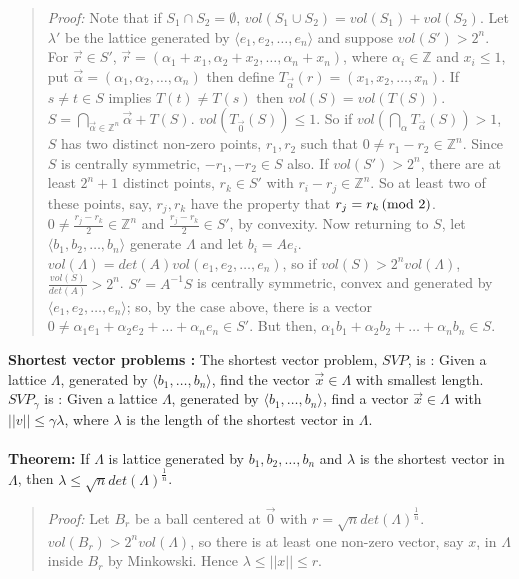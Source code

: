 \begin{quote}
\emph{Proof:}
Note that if $S_1 \cap S_2 = \emptyset$, $vol(S_1 \cup S_2) = vol(S_1) + vol(S_2)$.
Let $\lambda'$ be the lattice generated by $\langle e_1, e_2, \ldots, e_n \rangle$ and suppose $vol(S') > 2^n$.
For ${\vec r} \in S'$, ${\vec r} = (\alpha_1 + x_1, \alpha_2 + x_2, \ldots, \alpha_n + x_n)$,
where $\alpha_i \in {\mathbb Z}$ and
$x_i \leq 1$, put ${\vec \alpha} = (\alpha_1, \alpha_2, \ldots , \alpha_n)$ then
define $T_{\vec \alpha}(r) = (x_1, x_2, \ldots, x_n)$.
If $s \ne t \in S$ implies $T(t) \ne T(s)$ then
$vol(S) = vol(T(S))$. $S = \bigcap_{{\vec \alpha} \in {\mathbb Z}^n} {\vec \alpha} + T(S)$.
$vol(T_{\vec 0}(S)) \leq 1$.   So if $vol(\bigcap_{\alpha}T_{\vec \alpha}(S)) > 1$,
$S$ has two distinct non-zero
points, $r_1, r_2$ such that $0 \ne r_1 - r_2 \in {\mathbb Z}^n$. Since $S$ is centrally symmetric, $-r_1, -r_2 \in S$
also.  
If $vol(S') > 2^n$, there are at least $2^n +1$ distinct points, $r_k \in S'$ with $r_i - r_j \in {\mathbb Z}^n$.
So at least two of these points, say, $r_j, r_k$ have the property that $r_j = r_k \thinspace \textnormal{(mod } 2 \textnormal{)}$.
$0 \ne {\frac {r_j - r_k} {2}} \in {\mathbb Z}^n$ and ${\frac {r_j - r_k} {2}} \in S'$, by convexity.
Now returning to $S$, let $\langle b_1, b_2, \ldots, b_n \rangle$ generate $\Lambda$ and let
$b_i = A e_i$. $vol(\Lambda) = det(A) vol(e_1, e_2, \ldots, e_n)$, so if $vol(S) > 2^n vol(\Lambda)$,
${\frac {vol(S)} {det(A)}} > 2^n$.  $S' = A^{-1}S$ is centrally symmetric, convex and
generated by $\langle e_1, e_2, \ldots, e_n \rangle$; so, by the case above, there is a vector
$0 \ne \alpha_1 e_1 +\alpha_2 e_2 + \ldots  +\alpha_n e_n \in S'$.  But then,
$\alpha_1 b_1 +\alpha_2 b_2 + \ldots  +\alpha_n b_n \in S$.
\end{quote}
{\bf Shortest vector problems :}  The shortest vector problem, $SVP$, is :
Given a lattice $\Lambda$, generated by $\langle b_1 , \ldots , b_n \rangle$,
find the vector ${\vec x} \in \Lambda$ with smallest length.
$SVP_{\gamma}$ is :
Given a lattice $\Lambda$, generated by $\langle b_1 , \ldots , b_n \rangle$,
find a vector ${\vec x} \in \Lambda$ with $||v|| \leq \gamma \lambda$, where $\lambda$ is the length of the
shortest vector in $\Lambda$.
\\
\\
{\bf Theorem: } If $\Lambda$ is lattice generated by $b_1, b_2, \ldots, b_n$ and $\lambda$ is the shortest vector
in $\Lambda$, then $\lambda \leq \sqrt{n} det(\Lambda)^{\frac 1 n}$.
\begin{quote}
\emph{Proof:}
Let $B_r$ be a ball centered at ${\vec 0}$ with $r = \sqrt{n}det(\Lambda)^{\frac 1 n}$.
$vol(B_r) > 2^n vol(\Lambda)$, so there is at least one non-zero vector, say $x$, in $\Lambda$ inside $B_r$
by Minkowski. Hence $\lambda \leq ||x|| \leq r$.
\end{quote}
